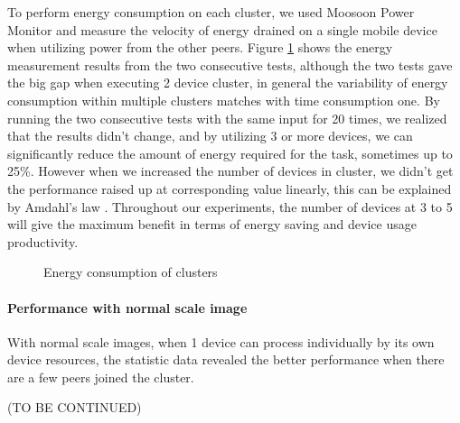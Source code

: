 \documentclass[conference]{IEEEtran}
\begin{document}
To perform energy consumption on each cluster, we used Moosoon Power Monitor and measure the velocity of energy drained on a single mobile device when utilizing power from the other peers. Figure \ref{fig:cluster_img_energy} shows the energy measurement results from the two consecutive tests, although the two tests gave the big gap when executing 2 device cluster, in general the variability of energy consumption within multiple clusters matches with time consumption one. By running the two consecutive tests with the same input for 20 times, we realized that the results didn't change, and by utilizing 3 or more devices, we can significantly reduce the amount of energy required for the task, sometimes up to 25\%. However when we increased the number of devices in cluster, we didn't get the performance raised up at corresponding value linearly, this can be explained by Amdahl's law \cite{amdahl}. Throughout our experiments, the number of devices at 3 to 5 will give the maximum benefit in terms of energy saving and device usage productivity.

\begin{figure}[H]
	\hspace*{-0.15cm}
	\caption{Energy consumption of clusters}
	\label{fig:cluster_img_energy}
\end{figure}

\paragraph{Performance with normal scale image}
With normal scale images, when 1 device can process individually by its own device resources, the statistic data revealed the better performance when there are a few peers joined the cluster.

(TO BE CONTINUED)
\end{document}
